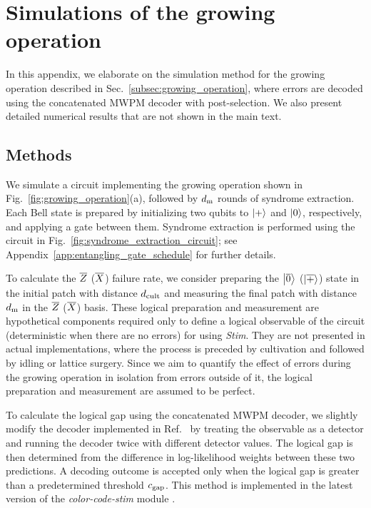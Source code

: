 \documentclass[
 prx,
 reprint,
 superscriptaddress,
 longbibliography,
 dvipsnames
]{revtex4-2}
\begin{document}
\section{Simulations of the growing operation \label{app:growing_operation_simulations}}

In this appendix, we elaborate on the simulation method for the growing operation described in Sec.~\ref{subsec:growing_operation}, where errors are decoded using the concatenated MWPM decoder with post-selection. 
We also present detailed numerical results that are not shown in the main text.

\subsection{Methods}

We simulate a circuit implementing the growing operation shown in Fig.~\ref{fig:growing_operation}(a), followed by $d_{\mathrm{m}}$ rounds of syndrome extraction. 
Each Bell state is prepared by initializing two qubits to $\ket{+}$ and $\ket{0}$, respectively, and applying a \cnot gate between them. 
Syndrome extraction is performed using the circuit in Fig.~\ref{fig:syndrome_extraction_circuit}; see Appendix~\ref{app:entangling_gate_schedule} for further details.

To calculate the $\overline{Z}$ ($\overline{X}$) failure rate, we consider preparing the $\ket{\overline{0}}$ ($\ket{\overline{+}}$) state in the initial patch with distance $d_\mathrm{cult}$ and measuring the final patch with distance $d_{\mathrm{m}}$ in the $\overline{Z}$ ($\overline{X}$) basis.
These logical preparation and measurement are hypothetical components required only to define a logical observable of the circuit (deterministic when there are no errors) for using \textit{Stim}. 
They are not presented in actual implementations, where the process is preceded by cultivation and followed by idling or lattice surgery.
Since we aim to quantify the effect of errors during the growing operation in isolation from errors outside of it, the logical preparation and measurement are assumed to be perfect.

To calculate the logical gap using the concatenated MWPM decoder, we slightly modify the decoder implemented in Ref.~\cite{lee2025color} by treating the observable as a detector and running the decoder twice with different detector values.
The logical gap is then determined from the difference in log-likelihood weights between these two predictions.
A decoding outcome is accepted only when the logical gap is greater than a predetermined threshold $c_{\mathrm{gap}}$.
This method is implemented in the latest version of the \textit{color-code-stim} module \cite{github:colorcodestim}.
\end{document}
